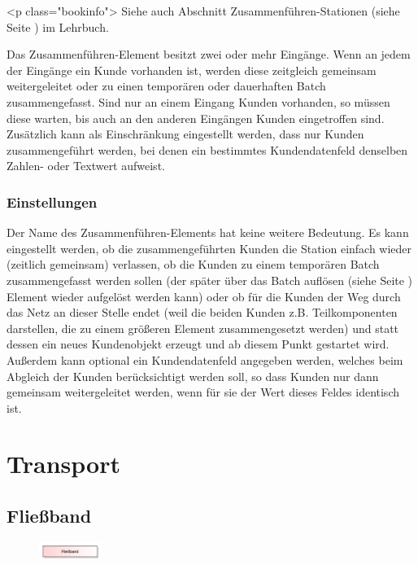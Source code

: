 <p class="bookinfo">
Siehe auch Abschnitt Zusammenführen-Stationen (siehe Seite \pageref{ref:book:8.2.8}) im Lehrbuch.

Das Zusammenführen-Element besitzt zwei oder mehr Eingänge. Wenn an jedem der Eingänge ein Kunde vorhanden ist,
werden diese zeitgleich gemeinsam weitergeleitet oder zu einen temporären oder dauerhaften Batch zusammengefasst.
Sind nur an einem Eingang Kunden vorhanden, so müssen diese warten, bis auch an den anderen Eingängen Kunden eingetroffen sind.
Zusätzlich kann als Einschränkung eingestellt werden, dass nur Kunden zusammengeführt werden, bei denen ein bestimmtes
Kundendatenfeld denselben Zahlen- oder Textwert aufweist.

\subsection*{Einstellungen}

Der Name des Zusammenführen-Elements hat keine weitere Bedeutung. Es kann eingestellt werden, ob die zusammengeführten
Kunden die Station einfach wieder (zeitlich gemeinsam) verlassen, ob die Kunden zu einem temporären
Batch zusammengefasst werden sollen (der später über das Batch auflösen (siehe Seite \pageref{ref:ModelElementSeparate}) Element
wieder aufgelöst werden kann) oder ob für die Kunden der Weg durch das Netz an
dieser Stelle endet (weil die beiden Kunden z.B. Teilkomponenten darstellen, die zu einem größeren Element zusammengesetzt
werden) und statt dessen ein neues Kundenobjekt erzeugt und ab diesem Punkt gestartet wird.
Außerdem kann optional ein Kundendatenfeld angegeben werden, welches beim Abgleich der Kunden berücksichtigt werden soll,
so dass Kunden nur dann gemeinsam weitergeleitet werden, wenn für sie der Wert dieses Feldes identisch ist.





\chapter{Transport}

\section{Fließband}
\label{ref:ModelElementConveyor}

\begin{figure}
\vspace{-22pt}
\includegraphics[width=2cm]{imageModelElementConveyor.png}
\vspace{-22pt}
\end{figure}


